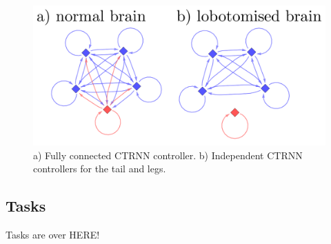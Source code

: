 \begin{figure}[h]
  \centering
  \includegraphics[width=5in]{fig/ctrnn-figures.pdf}
  \vspace{-15pt}
  \caption[Variation of CTRNN controllers]{\label{ctrnn-figures}a)
    Fully connected CTRNN controller. b) Independent CTRNN controllers
    for the tail and legs.}
\end{figure}

\subsection{Tasks}

Tasks are over HERE!


